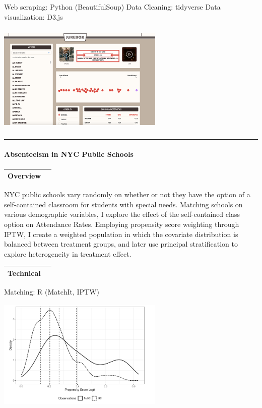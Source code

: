 \documentclass[
]{article}
\begin{document}
Web scraping: Python (BeautifulSoup) Data Cleaning: tidyverse Data
visualization: D3.js

\includegraphics[width=300px,height=200]{images/juke}

\begin{center}\rule{0.5\linewidth}{0.5pt}\end{center}

\hypertarget{absenteeism-in-nyc-public-schools}{%
\paragraph{Absenteeism in NYC Public
Schools}\label{absenteeism-in-nyc-public-schools}}

\begin{longtable}[]{@{}lr@{}}
\toprule
Overview & \\
\midrule
\endhead
\bottomrule
\end{longtable}

NYC public schools vary randomly on whether or not they have the option
of a self-contained classroom for students with special needs. Matching
schools on various demographic variables, I explore the effect of the
self-contained class option on Attendance Rates. Employing propensity
score weighting through IPTW, I create a weighted population in which
the covariate distribution is balanced between treatment groups, and
later use principal stratification to explore heterogeneity in treatment
effect.

\begin{longtable}[]{@{}lr@{}}
\toprule
Technical & \\
\midrule
\endhead
\bottomrule
\end{longtable}

Matching: R (MatchIt, IPTW)

\includegraphics[width=300px,height=200]{images/prop}
\end{document}
